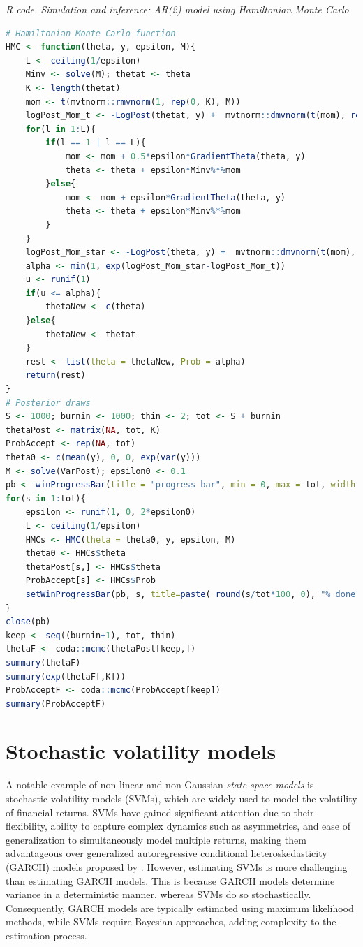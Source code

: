 \begin{tcolorbox}[enhanced,width=4.67in,center upper,
	fontupper=\large\bfseries,drop shadow southwest,sharp corners]
	\textit{R code. Simulation and inference: AR(2) model using Hamiltonian Monte Carlo}
	\begin{VF}
		\begin{lstlisting}[language=R]
# Hamiltonian Monte Carlo function
HMC <- function(theta, y, epsilon, M){
	L <- ceiling(1/epsilon)
	Minv <- solve(M); thetat <- theta
	K <- length(thetat)
	mom <- t(mvtnorm::rmvnorm(1, rep(0, K), M))
	logPost_Mom_t <- -LogPost(thetat, y) +  mvtnorm::dmvnorm(t(mom), rep(0, K), M, log = TRUE)  
	for(l in 1:L){
		if(l == 1 | l == L){
			mom <- mom + 0.5*epsilon*GradientTheta(theta, y)
			theta <- theta + epsilon*Minv%*%mom
		}else{
			mom <- mom + epsilon*GradientTheta(theta, y)
			theta <- theta + epsilon*Minv%*%mom
		}
	}
	logPost_Mom_star <- -LogPost(theta, y) +  mvtnorm::dmvnorm(t(mom), rep(0, K), M, log = TRUE)  
	alpha <- min(1, exp(logPost_Mom_star-logPost_Mom_t))
	u <- runif(1)
	if(u <= alpha){
		thetaNew <- c(theta)
	}else{
		thetaNew <- thetat
	}
	rest <- list(theta = thetaNew, Prob = alpha)
	return(rest)
}
# Posterior draws
S <- 1000; burnin <- 1000; thin <- 2; tot <- S + burnin
thetaPost <- matrix(NA, tot, K)
ProbAccept <- rep(NA, tot)
theta0 <- c(mean(y), 0, 0, exp(var(y))) 
M <- solve(VarPost); epsilon0 <- 0.1
pb <- winProgressBar(title = "progress bar", min = 0, max = tot, width = 300)
for(s in 1:tot){
	epsilon <- runif(1, 0, 2*epsilon0)
	L <- ceiling(1/epsilon)
	HMCs <- HMC(theta = theta0, y, epsilon, M) 
	theta0 <- HMCs$theta 
	thetaPost[s,] <- HMCs$theta
	ProbAccept[s] <- HMCs$Prob
	setWinProgressBar(pb, s, title=paste( round(s/tot*100, 0), "% done"))
}
close(pb)
keep <- seq((burnin+1), tot, thin)
thetaF <- coda::mcmc(thetaPost[keep,])
summary(thetaF)
summary(exp(thetaF[,K]))
ProbAcceptF <- coda::mcmc(ProbAccept[keep])
summary(ProbAcceptF)
\end{lstlisting}
	\end{VF}
\end{tcolorbox} 
    
\section{Stochastic volatility models}\label{sec83}
A notable example of non-linear and non-Gaussian \textit{state-space models} is stochastic volatility models (SVMs), which are widely used to model the volatility of financial returns. SVMs have gained significant attention due to their flexibility, ability to capture complex dynamics such as asymmetries, and ease of generalization to simultaneously model multiple returns, making them advantageous over generalized autoregressive conditional heteroskedasticity (GARCH) models proposed by \cite{bollerslev_1986}. However, estimating SVMs is more challenging than estimating GARCH models. This is because GARCH models determine variance in a deterministic manner, whereas SVMs do so stochastically. Consequently, GARCH models are typically estimated using maximum likelihood methods, while SVMs require Bayesian approaches, adding complexity to the estimation process.

